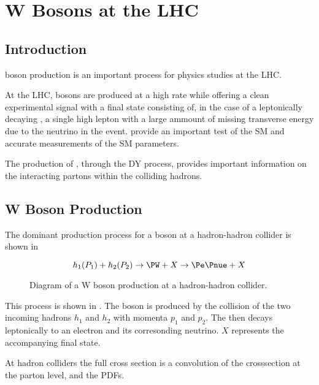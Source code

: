 \chapter{W Bosons at the LHC}

\section{Introduction}

\PW boson production is an important process for physics studies at the LHC.

At the \ac{LHC}, \PW bosons are produced at a high rate while offering a clean
experimental signal with a final state consisting of, in the case of a
leptonically decaying \PW, a single high \PT lepton with a large ammount of
missing transverse energy due to the neutrino in the event. \PW provide an
important test of the \ac{SM} and accurate measurements of the \ac{SM}
parameters. 

The production of \PW, through the \ac{DY} process, provides important
information on the interacting partons within the colliding hadrons.

\section{W Boson Production}

The dominant production process for a \PW boson at a hadron-hadron collider is
shown in 

\begin{equation}
  h_1(P_1) + h_2(P_2)
  \to 
  \PW + X
  \to
  \Pe \Pnue + X
  \label{wbos:wprod}
\end{equation}

\begin{figure}[htb]
  \centering
  \caption{Diagram of a W boson production at a hadron-hadron collider.}
  \label{wbos:wproddiag}
\end{figure}

This process is shown in . 
The \PW boson is produced by the collision of the two incoming hadrons $h_1$
and $h_2$ with momenta $p_1$ and $p_2$. The \PW then decays leptonically to an
electron and its corresonding neutrino. $X$ represents the accompanying final
state.

At hadron colliders the full cross section is a convolution of the crosssection
at the parton level, and the \acp{PDF}.

